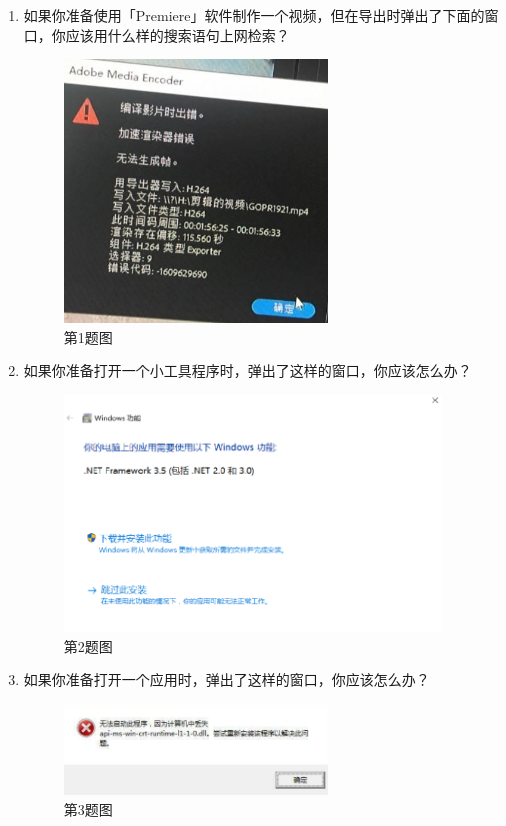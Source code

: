 \begin{enumerate}
  \item 如果你准备使用「Premiere」软件制作一个视频，但在导出时弹出了下面的窗口，你应该用什么样的搜索语句上网检索？
    \begin{figure}[htb!]
      \centering
      \includegraphics[width=7cm]{assets/Q_5_1.png}
      \caption{第1题图}
      \label{Q_5_1}
    \end{figure}
  \item 如果你准备打开一个小工具程序时，弹出了这样的窗口，你应该怎么办？
    \begin{figure}[htb!]
      \centering
      \includegraphics[width=10cm]{assets/Q_5_2.png}
      \caption{第2题图}
      \label{Q_5_2}
    \end{figure}
  \item 如果你准备打开一个应用时，弹出了这样的窗口，你应该怎么办？
    \begin{figure}[H]
      \centering
      \includegraphics[width=7cm]{assets/Q_5_3.png}
      \caption{第3题图}
      \label{Q_5_3}
    \end{figure}
\end{enumerate}